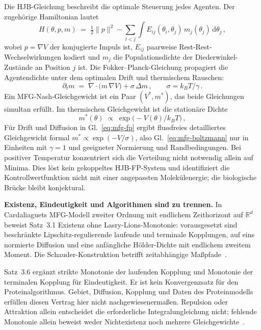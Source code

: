 \documentclass[12pt,a4paper]{article}
\theoremstyle{remark}
\begin{document}
Die HJB-Gleichung beschreibt die optimale Steuerung jedes Agenten. Der zugehörige Hamiltonian lautet
\begin{equation}\label{eq:mfg-hamiltonian}
  H(\theta,p,m) \;=\; \tfrac{1}{2}\|p\|^{2}
    - \sum_{i<j}\int E_{ij}(\theta_i,\theta_j)\,m_j(\theta_j)\,\mathrm{d}\theta_j\,,
\end{equation}
wobei $p=\nabla V$ der konjugierte Impuls ist, $E_{ij}$ paarweise Rest-Rest-Wechselwirkungen kodiert und $m_j$ die Populationsdichte der Diederwinkel-Zustände an Position $j$ ist. Die Fokker--Planck-Gleichung propagiert die Agentendichte unter dem optimalen Drift und thermischem Rauschen:
\begin{equation}\label{eq:mfg-fp}
  \partial_t m \;=\; \nabla\!\cdot\!\bigl(m\,\nabla V\bigr) + \sigma\,\Delta m\,,
  \qquad \sigma = k_B T / \gamma\,.
\end{equation}
Ein MFG-Nash-Gleichgewicht ist ein Paar $(V^{*},m^{*})$, das beide Gleichungen simultan erfüllt. Im thermischen Gleichgewicht ist die stationäre Dichte
\begin{equation}\label{eq:mfg-boltzmann}
  m^{*}(\theta) \;\propto\; \exp\!\bigl(-V(\theta)/k_B T\bigr)\,,
\end{equation}
Für Drift und Diffusion in Gl.~\eqref{eq:mfg-fp} ergibt flussfreies detailliertes Gleichgewicht formal $m^*\propto\exp(-V/\sigma)$, also Gl.~\eqref{eq:mfg-boltzmann} nur in Einheiten mit $\gamma=1$ und geeigneter Normierung und Randbedingungen. Bei positiver Temperatur konzentriert sich die Verteilung nicht notwendig allein auf Minima. Dies löst kein gekoppeltes HJB-FP-System und identifiziert die Kontrollwertfunktion nicht mit einer angepassten Molekülenergie; die biologische Brücke bleibt konjektural.

\textbf{Existenz, Eindeutigkeit und Algorithmen sind zu trennen.} In Cardaliaguets MFG-Modell zweiter Ordnung mit endlichem Zeithorizont auf $\mathbb R^d$ beweist Satz~3.1 Existenz ohne Lasry-Lions-Monotonie: vorausgesetzt sind beschränkte Lipschitz-regulierende laufende und terminale Kopplungen, auf eins normierte Diffusion und eine anfängliche H\"older-Dichte mit endlichem zweitem Moment. Die Schauder-Konstruktion betrifft zeitabhängige Maßpfade~\citep{Cardaliaguet2013}.

Satz~3.6 ergänzt strikte Monotonie der laufenden Kopplung und Monotonie der terminalen Kopplung für Eindeutigkeit. Er ist kein Konvergenzsatz für den Proteinalgorithmus. Gebiet, Diffusion, Kopplung und Daten des Proteinmodells erfüllen diesen Vertrag hier nicht nachgewiesenermaßen. Repulsion oder Attraktion allein entscheidet die erforderliche Integralungleichung nicht; fehlende Monotonie allein beweist weder Nichtexistenz noch mehrere Gleichgewichte~\citep{Cardaliaguet2013}.
\end{document}
